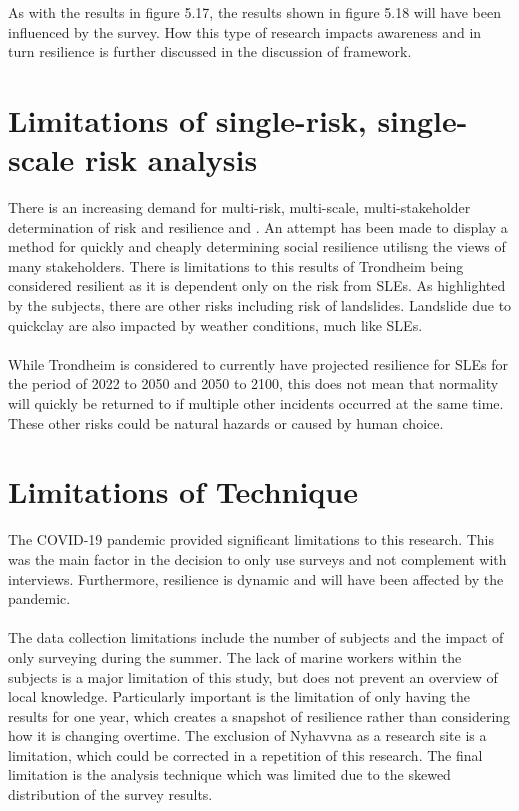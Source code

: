 As with the results in figure 5.17, the results shown in figure 5.18 will have been influenced by the survey. How this type of research impacts awareness and in turn resilience is further discussed in the discussion of framework. 


\section{Limitations of single-risk, single-scale risk analysis}
There is an increasing demand for multi-risk, multi-scale, multi-stakeholder determination of risk and resilience \cite{gerkensmeier_governing_2018} and \cite{cutter_community_2020}. An attempt has been made to display a method for quickly and cheaply determining social resilience utilisng the views of many stakeholders. There is limitations to this results of Trondheim being considered resilient as it is dependent only on the risk from SLEs. As highlighted by the subjects, there are other risks including risk of landslides. Landslide due to quickclay are also impacted by weather conditions, much like SLEs. 
\paragraph{}

While Trondheim is considered to currently have projected resilience for SLEs for the period of 2022 to 2050 and 2050 to 2100, this does not mean that normality will quickly be returned to if multiple other incidents occurred at the same time. These other risks could be natural hazards or caused by human choice. 

\section{Limitations of Technique}
The COVID-19 pandemic provided significant limitations to this research. This was the main factor in the decision to only use surveys and not complement with interviews. Furthermore, resilience is dynamic and will have been affected by the pandemic. 
\paragraph{}
The data collection limitations include the number of subjects and the impact of only surveying during the summer. The lack of marine workers within the subjects is a major limitation of this study, but does not prevent an overview of local knowledge. Particularly important is the limitation of only having the results for one year, which creates a snapshot of resilience rather than considering how it is changing overtime.  The exclusion of Nyhavvna as a research site is a limitation, which could be corrected in a repetition of this research.  The final limitation is the analysis technique which was limited due to the skewed distribution of the survey results.

